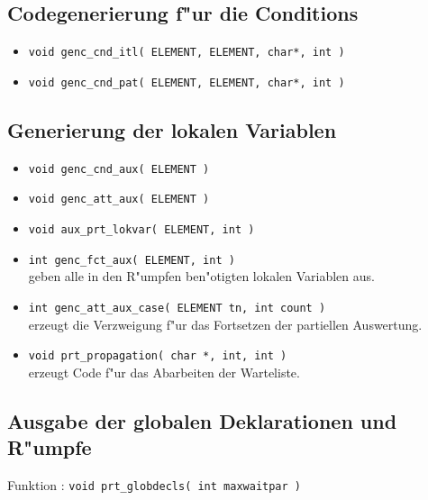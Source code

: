 
\subsection{Codegenerierung f"ur die Conditions}

\begin{itemize}
\item {\tt void genc\_cnd\_itl( ELEMENT, ELEMENT, char*, int )}\\
\item {\tt void genc\_cnd\_pat( ELEMENT, ELEMENT, char*, int )}
\end{itemize}

\subsection{Generierung der lokalen Variablen}

\begin{itemize}
\item {\tt void genc\_cnd\_aux( ELEMENT )}
\item {\tt void genc\_att\_aux( ELEMENT )}
\item {\tt void aux\_prt\_lokvar( ELEMENT, int )}
\item {\tt int  genc\_fct\_aux( ELEMENT, int )}\\
geben alle in den R"umpfen ben"otigten lokalen Variablen aus.

\item {\tt int  genc\_att\_aux\_case( ELEMENT tn, int count )}\\
erzeugt die Verzweigung f"ur das Fortsetzen der partiellen Auswertung.

\item {\tt void  prt\_propagation( char *, int, int ) }\\
erzeugt Code f"ur das Abarbeiten der Warteliste.
\end{itemize}

\subsection{Ausgabe der globalen Deklarationen und R"umpfe}

Funktion : {\tt void  prt\_globdecls( int maxwaitpar )}

